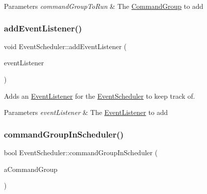 \begin{DoxyParams}{Parameters}
{\em command\+Group\+To\+Run} & The \mbox{\hyperlink{classlib_iterative_robot_1_1_command_group}{Command\+Group}} to add \\
\hline
\end{DoxyParams}
\mbox{\label{classlib_iterative_robot_1_1_event_scheduler_ad6e214ce9686a58eb37fb71796531b4e}} 
\subsubsection{\texorpdfstring{addEventListener()}{addEventListener()}}
{\footnotesize\ttfamily void Event\+Scheduler\+::add\+Event\+Listener (\begin{DoxyParamCaption}\item[{\mbox{\hyperlink{classlib_iterative_robot_1_1_event_listener}{Event\+Listener}} $\ast$}]{event\+Listener }\end{DoxyParamCaption})}



Adds an \mbox{\hyperlink{classlib_iterative_robot_1_1_event_listener}{Event\+Listener}} for the \mbox{\hyperlink{classlib_iterative_robot_1_1_event_scheduler}{Event\+Scheduler}} to keep track of. 


\begin{DoxyParams}{Parameters}
{\em event\+Listener} & The \mbox{\hyperlink{classlib_iterative_robot_1_1_event_listener}{Event\+Listener}} to add \\
\hline
\end{DoxyParams}
\mbox{\label{classlib_iterative_robot_1_1_event_scheduler_af47242d40b09df43698bb00cbe4f9300}} 
\subsubsection{\texorpdfstring{commandGroupInScheduler()}{commandGroupInScheduler()}}
{\footnotesize\ttfamily bool Event\+Scheduler\+::command\+Group\+In\+Scheduler (\begin{DoxyParamCaption}\item[{\mbox{\hyperlink{classlib_iterative_robot_1_1_command_group}{Command\+Group}} $\ast$}]{a\+Command\+Group }\end{DoxyParamCaption})\hspace{0.3cm}{\ttfamily [private]}}



